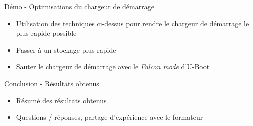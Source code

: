 \documentclass[a4paper,12pt,obeyspaces,spaces,hyphens]{article}
\begin{document}
\feagendaonecolumn
{Démo - Optimisations du chargeur de démarrage}
{
 \begin{itemize}
 \item Utilisation des techniques ci-dessus pour rendre le chargeur
       de démarrage le plus rapide possible
 \item Passer à un stockage plus rapide
 \item Sauter le chargeur de démarrage avec le {\em Falcon mode} d'U-Boot
 \end{itemize}
}

\feagendaonecolumn
{Conclusion - Résultats obtenus}
{
 \begin{itemize}
 \item Résumé des résultats obtenus
 \item Questions / réponses, partage d'expérience avec le formateur
 \end{itemize}
}
\end{document}
